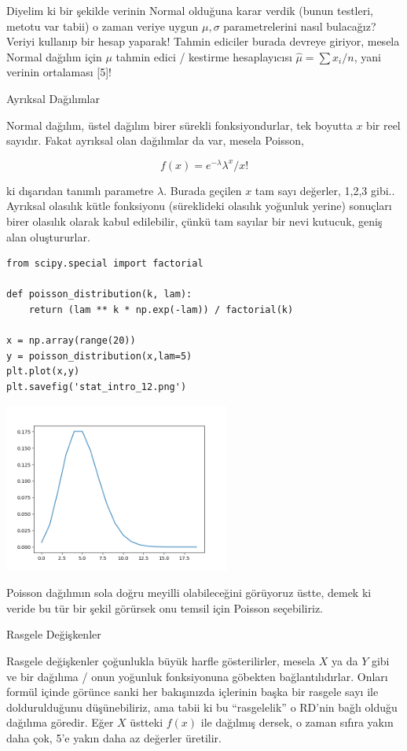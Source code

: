 \documentclass[12pt,fleqn]{article}\usepackage{../../common}
\begin{document}
Diyelim ki bir şekilde verinin Normal olduğuna karar verdik (bunun testleri,
metotu var tabii) o zaman veriye uygun $\mu,\sigma$ parametrelerini nasıl
bulacağız? Veriyi kullanıp bir hesap yaparak! Tahmin ediciler burada devreye
giriyor, mesela Normal dağılım için $\mu$ tahmin edici / kestirme hesaplayıcısı
$\hat{\mu} = \sum x_i / n$, yani verinin ortalaması [5]!

Ayrıksal Dağılımlar

Normal dağılım, üstel dağılım birer sürekli fonksiyondurlar, tek boyutta $x$
bir reel sayıdır. Fakat ayrıksal olan dağılımlar da var, mesela Poisson,

$$ f(x) = e^{-\lambda}\lambda^{x} / x! $$

ki dışarıdan tanımlı parametre $\lambda$. Burada geçilen $x$ tam sayı değerler,
1,2,3 gibi.. Ayrıksal olasılık kütle fonksiyonu (süreklideki olasılık yoğunluk
yerine) sonuçları birer olasılık olarak kabul edilebilir, çünkü tam sayılar bir
nevi kutucuk, geniş alan oluştururlar.

\begin{verbatim}
from scipy.special import factorial

def poisson_distribution(k, lam):
    return (lam ** k * np.exp(-lam)) / factorial(k)

x = np.array(range(20))
y = poisson_distribution(x,lam=5)
plt.plot(x,y)
plt.savefig('stat_intro_12.png')
\end{verbatim}

\includegraphics[width=20em]{stat_intro_12.png}

Poisson dağılımın sola doğru meyilli olabileceğini görüyoruz üstte, demek ki
veride bu tür bir şekil görürsek onu temsil için Poisson seçebiliriz.

Rasgele Değişkenler

Rasgele değişkenler çoğunlukla büyük harfle gösterilirler, mesela $X$ ya da $Y$
gibi ve bir dağılıma / onun yoğunluk fonksiyonuna göbekten
bağlantılıdırlar. Onları formül içinde görünce sanki her bakışınızda içlerinin
başka bir rasgele sayı ile doldurulduğunu düşünebiliriz, ama tabii ki bu
``rasgelelik'' o RD'nin bağlı olduğu dağılıma göredir. Eğer $X$ üstteki $f(x)$
ile dağılmış dersek, o zaman sıfıra yakın daha çok, 5'e yakın daha az değerler
üretilir.
\end{document}
